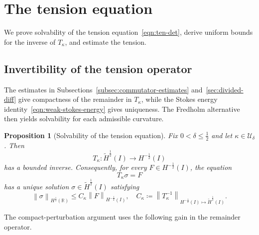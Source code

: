 \documentclass[11pt,reqno]{amsart}
\theoremstyle{plain}
\newtheorem{proposition}[theorem]{Proposition}
\theoremstyle{definition}
\numberwithin{equation}{section}
\newcommand{\mc}[1]{\mathcal{#1}}
\newcommand{\wt}[1]{\widetilde{#1}}
\newcommand{\norm}[1]{\left\lVert #1 \right\rVert}
\newcommand{\R}{\mathbb{R}}
\newcommand{\hi}[1]{H^{#1}(I)}
\newcommand{\thi}[1]{\wt H^{#1}(I)}
\newcommand{\hr}[1]{H^{#1}(\R)}
\begin{document}
\section{The tension equation}
\label{sec:tension}

We prove solvability of the tension equation~\eqref{eqn:ten-det}, derive uniform bounds for
the inverse of $T_\kappa$, and estimate the tension.

\subsection{Invertibility of the tension operator}
\label{subsec:tension-existence}

The estimates in Subsections~\ref{subsec:commutator-estimates}
and~\ref{sec:divided-diff} give compactness of the remainder in $T_\kappa$,
while the Stokes energy identity~\eqref{eqn:weak-stokes-energy} gives uniqueness. The Fredholm alternative
then yields solvability for each admissible curvature.

\begin{proposition}[Solvability of the tension equation]\label{prop:main-tension}
Fix $0<\delta\le\frac12$ and let $\kappa\in\mc U_\delta$. Then
\begin{equation}
    T_\kappa:
    \thi{\frac12}\longrightarrow\hi{-\frac12}
\end{equation}
has a bounded inverse. Consequently, for every
$F\in\hi{-\frac12}$, the equation
\begin{equation}
    T_\kappa\sigma=F
\end{equation}
has a unique solution $\sigma\in\thi{\frac12}$ satisfying
\begin{equation}\label{eqn:c-kappa}
    \norm{\sigma}_{\hr{\frac12}}
    \le C_\kappa\norm{F}_{\hi{-\frac12}},
    \quad
    C_\kappa
    \coloneqq\norm{T_\kappa^{-1}}_{
    \hi{-\frac12}\mapsto\thi{\frac12}}.
\end{equation}
\end{proposition}

The compact-perturbation argument uses the following gain in the remainder
operator.
\end{document}
